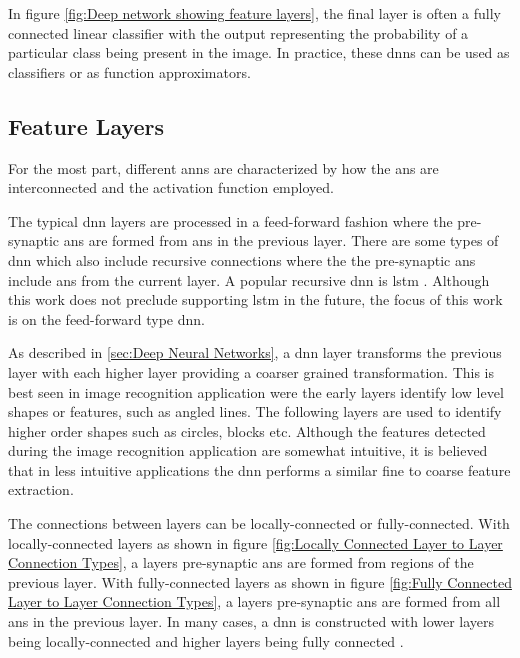 In figure \ref{fig:Deep network showing feature layers}, the final layer is often a fully connected linear classifier with the output representing the probability of a particular class being present in the image.
In practice, these \acp{dnn} can be used as classifiers or as function approximators.

\iffalse
In practice, useful deep neural networks are very large and often exceed the capacity of single GPUs. Therefore,  there is opportunity for a solution that provides
real-time acceleration and storage of of these systems.
\fi


\subsection{Feature Layers}
\label{sec:Feature Layers}

For the most part, different \acp{ann} are characterized by how the \acp{an} are interconnected and the activation function employed.

The typical \ac{dnn} layers are processed in a feed-forward fashion where the pre-synaptic \acp{an} are formed from \acp{an} in the previous layer.
There are some types of \ac{dnn} which also include recursive connections where the the pre-synaptic \acp{an} include \acp{an} from the current layer.
A popular recursive \ac{dnn} is \acf{lstm} \cite{hochreiter1997long}. Although this work does not preclude supporting \ac{lstm} in the future, the focus of this work is on the feed-forward type \ac{dnn}.

As described in \ref{sec:Deep Neural Networks}, a \ac{dnn} layer transforms the previous layer with each higher layer providing a coarser grained transformation. 
This is best seen in image recognition application were the early layers identify low level shapes or features, such as angled lines. 
The following layers are used to identify higher order shapes such as circles, blocks etc. 
Although the features detected during the image recognition application are somewhat intuitive, it is believed that in less intuitive applications the \ac{dnn} performs a similar fine to coarse feature extraction.

The connections between layers can be locally-connected or fully-connected. 
With locally-connected layers as shown in figure \ref{fig:Locally Connected Layer to Layer Connection Types}, a layers pre-synaptic \acp{an} are formed from regions of the previous layer.
With fully-connected layers as shown in figure \ref{fig:Fully Connected Layer to Layer Connection Types}, a layers pre-synaptic \acp{an} are formed from all \acp{an} in the previous layer.
In many cases, a \ac{dnn} is constructed with lower layers being locally-connected and higher layers being fully connected \cite{krizhevsky2012imagenet}.

